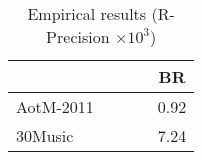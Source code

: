 \begin{table}[!h]
\centering
\caption{Empirical results (R-Precision $\times 10^3$)}
\small
\begin{tabular}{l|cccc}
\toprule
{}            & & & & BR \\
\midrule
AotM-2011     &  &  &  & 0.92 \\
30Music       &  &  &  & 7.24 \\
\bottomrule
\end{tabular}
\end{table}
